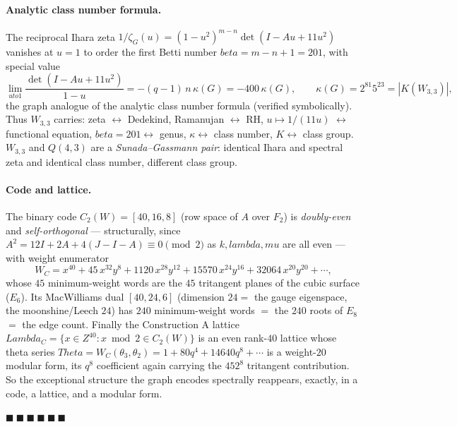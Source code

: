 \documentclass[12pt,a4paper]{article}
\def\mathbb#1{#1}%
\def\beta{beta}%
\def\lambda{lambda}%
\def\Lambda{Lambda}%
\def\mu{mu}%
\def\Theta{Theta}%
\def\cdot{ }%
\def\to{ to }%
\theoremstyle{definition}
\begin{document}
\paragraph{Analytic class number formula.}
The reciprocal Ihara zeta $1/\zeta_G(u)=(1-u^2)^{m-n}\det(I-Au+11u^2)$ vanishes
at $u=1$ to order the first Betti number $\beta=m-n+1=201$, with special value
\[
\lim_{u\to1}\frac{\det(I-Au+11u^2)}{1-u} = -(q-1)\,n\,\kappa(G) = -400\,\kappa(G),
\qquad \kappa(G)=2^{81}5^{23}=|K(W_{3,3})|,
\]
the graph analogue of the analytic class number formula (verified symbolically).
Thus $W_{3,3}$ carries: zeta $\leftrightarrow$ Dedekind, Ramanujan
$\leftrightarrow$ RH, $u\mapsto1/(11u)$ $\leftrightarrow$ functional equation,
$\beta=201\leftrightarrow$ genus, $\kappa\leftrightarrow$ class number, $K
\leftrightarrow$ class group.  $W_{3,3}$ and $Q(4,3)$ are a
\emph{Sunada--Gassmann pair}: identical Ihara and spectral zeta and identical
class number, different class group.

\paragraph{Code and lattice.}
The binary code $C_2(W)=[40,16,8]$ (row space of $A$ over $\mathbb{F}_2$) is
\emph{doubly-even} and \emph{self-orthogonal} --- structurally, since $A^2 =
12I+2A+4(J-I-A)\equiv0\pmod 2$ as $k,\lambda,\mu$ are all even --- with weight
enumerator
\[
W_C = x^{40}+45\,x^{32}y^{8}+1120\,x^{28}y^{12}+15570\,x^{24}y^{16}
      +32064\,x^{20}y^{20}+\cdots,
\]
whose $45$ minimum-weight words are the $45$ tritangent planes of the cubic
surface ($E_6$).  Its MacWilliams dual $[40,24,6]$ (dimension $24=$ the gauge
eigenspace, the moonshine/Leech $24$) has $240$ minimum-weight words $=$ the
$240$ roots of $E_8$ $=$ the edge count.  Finally the Construction A lattice
$\Lambda_C=\{x\in\mathbb{Z}^{40}:x\bmod2\in C_2(W)\}$ is an even rank-$40$
lattice whose theta series $\Theta=W_C(\theta_3,\theta_2)=1+80q^{4}+14640q^{8}
+\cdots$ is a weight-$20$ modular form, its $q^8$ coefficient again carrying the
$45\cdot2^8$ tritangent contribution.  So the exceptional structure the graph
encodes spectrally reappears, exactly, in a code, a lattice, and a modular form.

\hfill $\blacksquare\ \blacksquare\ \blacksquare\ \blacksquare\ \blacksquare\ \blacksquare$

\clearpage
\end{document}
